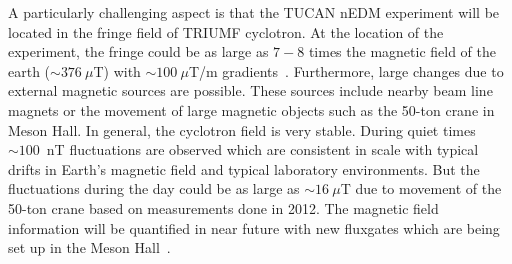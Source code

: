 
A particularly challenging aspect is that the TUCAN nEDM experiment will be located in the fringe field of TRIUMF cyclotron. At the location of the experiment, the fringe could be as large as $7-8$ times the magnetic field of the earth ($\sim376~\mu$T) with $\sim100~\mu$T/m gradients~\cite{sarte}. Furthermore, large changes due to external magnetic sources are possible. These sources include nearby beam line magnets or the movement of large magnetic objects such as the 50-ton crane in Meson Hall. In general, the cyclotron field is very stable. During quiet times  $\sim100$~nT fluctuations are observed which are consistent in scale with typical drifts in Earth's magnetic field and typical laboratory environments. But the fluctuations during the day could be as large as  $\sim16~\mu$T due to movement of the 50-ton crane based on measurements done in 2012. The magnetic field information will be quantified in near future with new fluxgates which are being set up in the Meson Hall~\cite{beapriv}.







